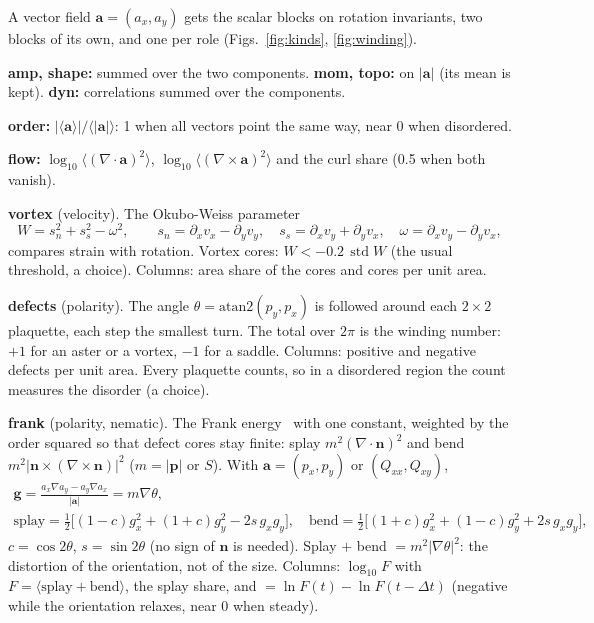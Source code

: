 \documentclass[11pt,a4paper]{article}
\newcommand{\code}[1]{\texttt{\detokenize{#1}}}
\newcommand{\avg}[1]{\langle #1 \rangle}
\DeclareMathOperator{\std}{std}
\begin{document}
\begin{tech}
A vector field $\mathbf a=(a_x,a_y)$ gets the scalar blocks on rotation invariants, two blocks of its own,
and one per role (Figs.~\ref{fig:kinds}, \ref{fig:winding}).

\textbf{amp, shape:} summed over the two components. \textbf{mom, topo:} on $|\mathbf a|$ (its mean is
kept). \textbf{dyn:} correlations summed over the components.

\textbf{order:} $|\avg{\mathbf a}|/\avg{|\mathbf a|}$: 1 when all vectors point the same way, near 0 when
disordered.

\textbf{flow:} $\log_{10}\avg{(\nabla\!\cdot\!\mathbf a)^2}$, $\log_{10}\avg{(\nabla\!\times\!\mathbf a)^2}$ and
the curl share (0.5 when both vanish).

\textbf{vortex} (velocity). The Okubo-Weiss parameter~\cite{okubo1970,weiss1991}
\[
W=s_n^2+s_s^2-\omega^2,\qquad s_n=\partial_xv_x-\partial_yv_y,\quad s_s=\partial_xv_y+\partial_yv_x,\quad
\omega=\partial_xv_y-\partial_yv_x,
\]
compares strain with rotation. Vortex cores: $W<-0.2\,\std W$ (the usual threshold, a choice). Columns: area
share of the cores and cores per unit area.

\textbf{defects} (polarity). The angle $\theta=\mathrm{atan2}(p_y,p_x)$ is followed around each $2\times2$
plaquette, each step the smallest turn. The total over $2\pi$ is the winding number: $+1$ for an aster or a
vortex, $-1$ for a saddle. Columns: positive and negative defects per unit area. Every plaquette counts,
so in a disordered region the count measures the disorder (a choice).

\textbf{frank} (polarity, nematic). The Frank energy~\cite{frank1958} with one constant, weighted by the order
squared so that defect cores stay finite: splay $m^2(\nabla\cdot\mathbf n)^2$ and bend
$m^2|\mathbf n\times(\nabla\times\mathbf n)|^2$ ($m=|\mathbf p|$ or $S$). With $\mathbf a=(p_x,p_y)$ or
$(Q_{xx},Q_{xy})$,
\[
\begin{gathered}
\mathbf g=\frac{a_x\nabla a_y-a_y\nabla a_x}{|\mathbf a|}=m\nabla\theta,\\
\text{splay}=\tfrac12\big[(1-c)g_x^2+(1+c)g_y^2-2s\,g_xg_y\big],\quad
\text{bend}=\tfrac12\big[(1+c)g_x^2+(1-c)g_y^2+2s\,g_xg_y\big],
\end{gathered}
\]
$c=\cos2\theta$, $s=\sin2\theta$ (no sign of $\mathbf n$ is needed). Splay $+$ bend $=m^2|\nabla\theta|^2$: the
distortion of the orientation, not of the size. Columns: $\log_{10}F$ with $F=\avg{\text{splay}+\text{bend}}$,
the splay share, and \code{change} $=\ln F(t)-\ln F(t-\Delta t)$ (negative while the orientation relaxes,
near 0 when steady).


\end{tech}
\end{document}
